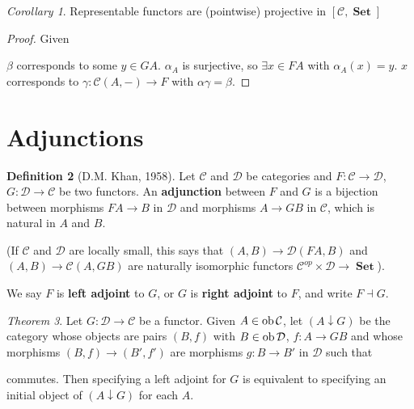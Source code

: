 \documentclass[a4paper]{article}
\theoremstyle{definition}
\newtheorem{definition}{Definition}
\theoremstyle{remark}
\theoremstyle{default}
\newtheorem{corollary}[definition]{Corollary}
\newtheorem{theorem}[definition]{Theorem}
\numberwithin{definition}{section}
\newcommand*\ob[1]{\textnormal{ob}\,#1}
\DeclareMathOperator{\Set}{\textbf{Set}}
\begin{document}
\begin{corollary}
	Representable functors are (pointwise) projective in $[\mathcal{C}, \Set]$
\end{corollary}
\begin{proof}
	Given
	\begin{center}
	\end{center}
	$\beta$ corresponds to some $y \in GA$. 
	$\alpha_A$ is surjective, so $\exists x \in FA$ with $\alpha_A(x)=y$.
	$x$ corresponds to $\gamma: \mathcal{C}(A, -) \to F$ with $\alpha\gamma = \beta$.
\end{proof}

\section{Adjunctions}
\begin{definition}[D.M. Khan, 1958]
	Let $\mathcal{C}$ and $\mathcal{D}$ be categories and $F: \mathcal{C} \to \mathcal{D}$, $G: \mathcal{D} \to \mathcal{C}$ be two functors.
	An \textbf{adjunction} between $F$ and $G$ is a bijection between morphisms $FA \to B$ in $\mathcal{D}$ and morphisms $A \to GB$ in $\mathcal{C}$, 
	which is natural in $A$ and $B$.

	(If $\mathcal{C}$ and $\mathcal{D}$ are locally small,
	this says that $(A, B) \to \mathcal{D}(FA, B)$ and $(A, B) \to \mathcal{C}(A, GB)$
	are naturally isomorphic functors $\mathcal{C}^{op} \times \mathcal{D} \to \Set$).
	
	We say $F$ is \textbf{left adjoint} to $G$,
	or $G$ is \textbf{right adjoint} to $F$,
	and write $F \dashv G$.
\end{definition}

\begin{theorem}
	Let $G: \mathcal{D} \to \mathcal{C}$ be a functor.
	Given $A \in \ob \mathcal{C}$,
	let $(A \downarrow G)$ be the category whose objects are pairs $(B, f)$
	with $B \in \ob \mathcal{D}$,
	$f: A \to GB$ and whose morphisms $(B, f) \to (B', f')$
	are morphisms $g: B \to B'$ in $\mathcal{D}$ such that
	\begin{center}
	\end{center}
	commutes.
	Then specifying a left adjoint for $G$ is equivalent to specifying an initial object of $(A \downarrow G)$ for each $A$.
	\label{33}
\end{theorem}
\end{document}
